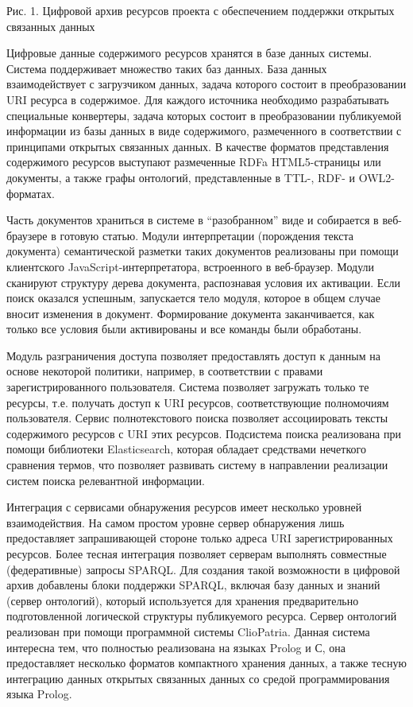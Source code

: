 \documentclass[a4paper,12pt,openany,final]{extreport}
\begin{document}
Рис. 1. Цифровой архив ресурсов проекта с обеспечением поддержки
открытых связанных данных

Цифровые данные содержимого ресурсов хранятся в базе данных системы.
Система поддерживает множество таких баз данных. База данных
взаимодействует с загрузчиком данных, задача которого состоит в
преобразовании URI ресурса в содержимое. Для каждого источника
необходимо разрабатывать специальные конвертеры, задача которых состоит
в преобразовании публикуемой информации из базы данных в виде
содержимого, размеченного в соответствии с принципами открытых связанных
данных. В качестве форматов представления содержимого ресурсов выступают
размеченные RDFa HTML5-страницы или документы, а также графы онтологий,
представленные в TTL-, RDF- и OWL2-форматах.

Часть документов храниться в системе в ``разобранном'' виде и собирается
в веб-браузере в готовую статью. Модули интерпретации (порождения текста
документа) семантической разметки таких документов реализованы при
помощи клиентского JavaScript-интерпретатора, встроенного в веб-браузер.
Модули сканируют структуру дерева документа, распознавая условия их
активации. Если поиск оказался успешным, запускается тело модуля,
которое в общем случае вносит изменения в документ. Формирование
документа заканчивается, как только все условия были активированы и все
команды были обработаны.

Модуль разграничения доступа позволяет предоставлять доступ к данным на
основе некоторой политики, например, в соответствии с правами
зарегистрированного пользователя. Система позволяет загружать только те
ресурсы, т.е. получать доступ к URI ресурсов, соответствующие
полномочиям пользователя. Сервис полнотекстового поиска позволяет
ассоциировать тексты содержимого ресурсов с URI этих ресурсов.
Подсистема поиска реализована при помощи библиотеки Elasticsearch,
которая обладает средствами нечеткого сравнения термов, что позволяет
развивать систему в направлении реализации систем поиска релевантной
информации.

Интеграция с сервисами обнаружения ресурсов имеет несколько уровней
взаимодействия. На самом простом уровне сервер обнаружения лишь
предоставляет запрашивающей стороне только адреса URI зарегистрированных
ресурсов. Более тесная интеграция позволяет серверам выполнять
совместные (федеративные) запросы SPARQL. Для создания такой возможности
в цифровой архив добавлены блоки поддержки SPARQL, включая базу данных и
знаний (сервер онтологий), который используется для хранения
предварительно подготовленной логической структуры публикуемого ресурса.
Сервер онтологий реализован при помощи программной системы ClioPatria.
Данная система интересна тем, что полностью реализована на языках Prolog
и С, она предоставляет несколько форматов компактного хранения данных, а
также тесную интеграцию данных открытых связанных данных со средой
программирования языка Prolog.
\end{document}
